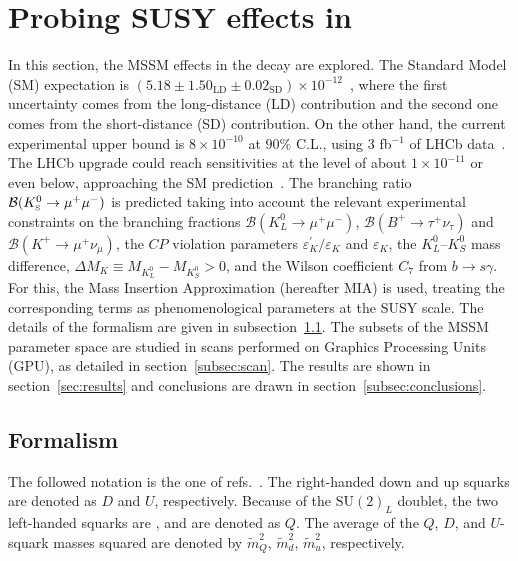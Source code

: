 \section{Probing SUSY effects in \KsMuMu}
In this section, the MSSM effects in the \KsMuMu decay are explored. The Standard Model (SM) expectation is $(5.18\pm 1.50_{\textrm{LD}} \pm 0.02_{\textrm{SD}})\times 10^{-12}$~\cite{Ecker:1991ru, Isidori:2003ts, DAmbrosio:2017klp}, where the first uncertainty comes from the long-distance (LD) contribution and the second one comes from the short-distance (SD) contribution. 
On the other hand, the current experimental upper bound is $8\times10^{-10}$ at $90\%$ C.L{.,} using $3$ fb${}^{-1}$ of LHCb data~\cite{LHCb:KsMuMu}. The LHCb upgrade could reach sensitivities at the level of about $1\times 10^{-11}$ or even below, approaching the SM prediction~\cite{DMS_FPCP}.
The branching ratio $\mathcal{B}(K^0_{\mathrm{\scriptscriptstyle S}}\rightarrow\mu^{+}\mu^{-})$ is predicted taking into account the relevant experimental constraints on the branching fractions $\mathcal{B}(K_L^0\rightarrow\mu^+\mu^-)$, $\mathcal{B}(B^+\rightarrow\tau^+\nu_{\tau})$ and $\mathcal{B}(K^+\rightarrow\mu^+\nu_{\mu})$, the $CP$ violation parameters $\varepsilon^{\prime}_K/\varepsilon_K$ and $\varepsilon_K$, the $K^{0}_{L}$--$K^{0}_{S}$ mass difference, $\Delta M_{K}\equiv M_{K^0_L} - M_{K^0_S}  > 0$, and the Wilson coefficient $C_7$ from $b\rightarrow s \gamma$. 
For this, the Mass Insertion Approximation (hereafter MIA)\cite{MassInsertion} is used, treating the corresponding terms as phenomenological parameters at the SUSY scale. The details of the formalism are given in subsection~\ref{subsec:formalism}. The subsets of the MSSM parameter space are studied in scans performed on Graphics Processing Units (GPU), as detailed in section~\ref{subsec:scan}. The results are shown in section~\ref{sec:results} and conclusions are drawn in section~\ref{subsec:conclusions}.

\subsection{Formalism}
\label{subsec:formalism}
The followed notation is the one of refs.~\cite{Altmannshofer:2009ne, Rosiek:1995kg}. The right-handed down and up squarks are denoted as $D$ and $U$, respectively. Because of the $\textrm{SU}(2)_{L}$ doublet, the two left-handed squarks are , and are denoted as $Q$. The average of the $Q$, $D$, and $U$-squark masses squared are denoted by $\tilde{m}^2_Q$, $\tilde{m}^2_d$, $\tilde{m}^2_u$, respectively.

